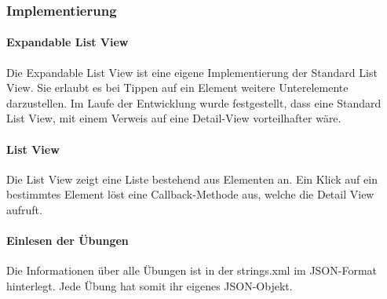 \documentclass[FIPLY_base.tex]{subfiles}
\begin{document}
\subsubsection{Implementierung}
\paragraph{Expandable List View}
Die Expandable List View ist eine eigene Implementierung der Standard List View. Sie erlaubt es bei Tippen auf ein Element weitere Unterelemente darzustellen.
Im Laufe der Entwicklung wurde festgestellt, dass eine Standard List View, mit einem Verweis auf eine Detail-View vorteilhafter wäre.

\paragraph{List View}
Die List View zeigt eine Liste bestehend aus Elementen an. Ein Klick auf ein bestimmtes Element löst eine Callback-Methode aus, welche die Detail View aufruft.
\newpage
\paragraph{Einlesen der Übungen}
Die Informationen über alle Übungen ist in der strings.xml im JSON-Format hinterlegt.
Jede Übung hat somit ihr eigenes JSON-Objekt. 
\end{document}
